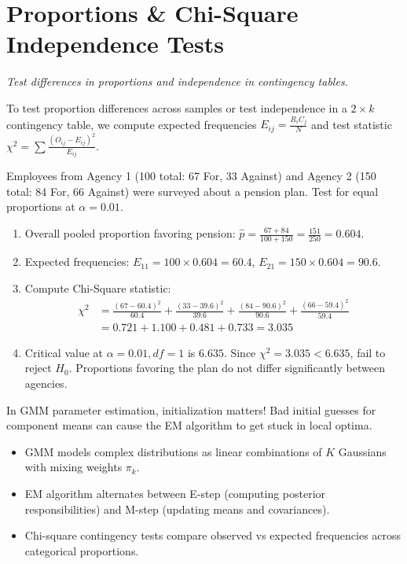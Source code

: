 \documentclass[10pt,a4paper]{article}
\newenvironment{worked}{\begin{tcolorbox}}{\end{tcolorbox}}
\newenvironment{watchout}{\begin{tcolorbox}}{\end{tcolorbox}}
\newenvironment{keytake}{\begin{tcolorbox}}{\end{tcolorbox}}
\newenvironment{steps}{\begin{enumerate}[label=\textbf{Step \arabic*:},leftmargin=*]}{\end{enumerate}}
\newcommand{\secsub}[1]{\noindent\textit{\large #1}\vspace{0.8em}}
\begin{document}
\section{Proportions \& Chi-Square Independence Tests}
\secsub{Test differences in proportions and independence in contingency tables.}

To test proportion differences across samples or test independence in a $2 \times k$ contingency table, we compute expected frequencies $E_{ij} = \frac{R_i C_j}{N}$ and test statistic $\chi^2 = \sum \frac{(O_{ij} - E_{ij})^2}{E_{ij}}$.

\begin{worked}
Employees from Agency 1 (100 total: 67 For, 33 Against) and Agency 2 (150 total: 84 For, 66 Against) were surveyed about a pension plan. Test for equal proportions at $\alpha = 0.01$.
\begin{steps}
\item Overall pooled proportion favoring pension: $\hat{p} = \frac{67 + 84}{100 + 150} = \frac{151}{250} = 0.604$.
\item Expected frequencies: $E_{11} = 100 \times 0.604 = 60.4$, $E_{21} = 150 \times 0.604 = 90.6$.
\item Compute Chi-Square statistic:
\begin{align*}
\chi^2 &= \frac{(67 - 60.4)^2}{60.4} + \frac{(33 - 39.6)^2}{39.6} + \frac{(84 - 90.6)^2}{90.6} + \frac{(66 - 59.4)^2}{59.4} \\
&= 0.721 + 1.100 + 0.481 + 0.733 = 3.035
\end{align*}
\item Critical value at $\alpha = 0.01, df = 1$ is $6.635$. Since $\chi^2 = 3.035 < 6.635$, fail to reject $H_0$. Proportions favoring the plan do not differ significantly between agencies.
\end{steps}
\end{worked}

\begin{watchout}
In GMM parameter estimation, initialization matters! Bad initial guesses for component means can cause the EM algorithm to get stuck in local optima.
\end{watchout}

\begin{keytake}
\begin{itemize}
\item GMM models complex distributions as linear combinations of $K$ Gaussians with mixing weights $\pi_k$.
\item EM algorithm alternates between E-step (computing posterior responsibilities) and M-step (updating means and covariances).
\item Chi-square contingency tests compare observed vs expected frequencies across categorical proportions.
\end{itemize}
\end{keytake}
\end{document}
